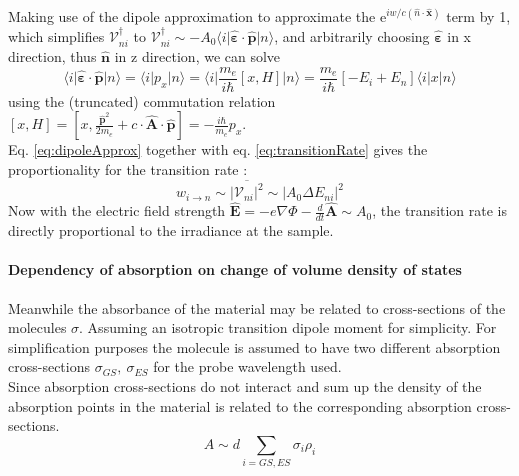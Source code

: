 \documentclass[twoside,openright,listof=numbered]{scrreprt}
\begin{document}
Making use of the dipole approximation to approximate the $\mathrm{e}^{iw/c\left(\hat{n}\cdot\mathbf{\hat{x}}\right)}$ term by 1, which simplifies $\mathcal{V}^\dagger_{ni}$ to $\mathcal{V}^\dagger_{ni} \sim -A_0\langle i\lvert \mathbf{\hat{\varepsilon}}\cdot\mathbf{\hat{p}}\rvert n \rangle$, and arbitrarily choosing $\mathbf{\hat{\varepsilon}}$ in x direction, thus $\mathbf{\hat{n}}$ in z direction, we can solve
\begin{equation}\langle i\lvert \mathbf{\hat{\varepsilon}}\cdot\mathbf{\hat{p}}\rvert n \rangle = \langle i\lvert p_x\rvert n \rangle = \langle i\lvert \frac{m_e}{i\hbar}\left[x,H\right]\rvert n \rangle = \frac{m_e}{i\hbar} \left[-E_i + E_n\right]\langle i\lvert x\rvert n \rangle\label{eq:dipoleApprox}
\end{equation}
 using the (truncated) commutation relation $[x, H] = [x, \frac{\mathbf{\hat{p}}^2}{2m_e} + c\cdot\mathbf{\hat{A}}\cdot \mathbf{\hat{p}}] = -\frac{i\hbar}{m_e} p_x$.\\
Eq. \ref{eq:dipoleApprox} together with eq. \ref{eq:transitionRate} gives the proportionality for the transition rate :\cite[chapter 5.7-5.8]{Sakurai_Napolitano_2017}
\begin{equation}
w_{i\rightarrow n} \sim \overline{\lvert \mathcal{V}_{ni}\rvert^2} \sim \lvert A_0 \Delta E_{ni}\rvert^2
\end{equation}
Now with the electric field strength $\mathbf{\hat{E}} = -e\nabla\Phi - \frac{d}{dt} \mathbf{\hat{A}}\sim A_0$, the transition rate is directly proportional to the irradiance at the sample.

\paragraph{Dependency of absorption on change of volume density of states}
Meanwhile the absorbance of the material may be related to  cross-sections of the molecules $\sigma$. Assuming an isotropic transition dipole moment for simplicity. For simplification purposes the molecule is assumed to have two different absorption cross-sections $\sigma_{GS},\ \sigma_{ES}$ for the probe wavelength used.\\
Since absorption cross-sections do not interact and sum up the density of the absorption points in the material is related to the corresponding absorption cross-sections.
\begin{equation}
A \sim d \sum_{i=GS, ES} \sigma_{i} \rho_i
\end{equation}
\end{document}
